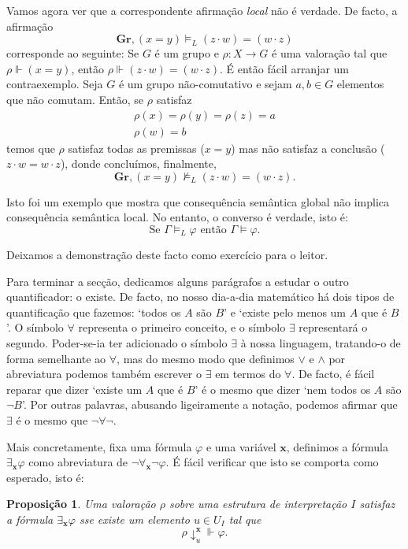 \documentclass{report}
\newtheorem{prop}{Proposição}
\theoremstyle{definition}
\theoremstyle{remark}
\renewcommand{\bf}[1]{\mathbf{#1}}
\begin{document}
	Vamos agora ver que a correspondente afirmação \emph{local} não é verdade. De facto, a afirmação
	\[\mathbf{Gr}, (x = y) \vDash_L (z \cdot w) = (w \cdot z)\]
	corresponde ao seguinte: Se $G$ é um grupo e $\rho : X \to G$ é uma valoração tal que $\rho \Vdash (x = y)$, então $\rho \Vdash (z \cdot w) = (w \cdot z)$. É então fácil arranjar um contraexemplo. Seja $G$ é um grupo não-comutativo e sejam $a, b \in G$ elementos que não comutam. Então, se $\rho$ satisfaz
	\begin{gather*}
	\rho(x) = \rho(y) = \rho(z) = a\\
	\rho(w) = b
	\end{gather*}
	temos que $\rho$ satisfaz todas as premissas ($x = y$) mas não satisfaz a conclusão ($z\cdot w = w\cdot z$), donde concluímos, finalmente,
	\[\mathbf{Gr}, (x = y) \nvDash_L (z \cdot w) = (w \cdot z).\]
	
	Isto foi um exemplo que mostra que consequência semântica global não implica consequência semântica local. No entanto, o converso é verdade, isto é:
	\[\text{Se } \Gamma \vDash_L \varphi \text{ então } \Gamma \vDash \varphi.\]
	
	Deixamos a demonstração deste facto como exercício para o leitor.

	\medskip

	Para terminar a secção, dedicamos alguns parágrafos a estudar o outro quantificador: o existe. De facto, no nosso dia-a-dia matemático há dois tipos de quantificação que fazemos: `todos os $A$ são $B$' e `existe pelo menos um $A$ que é $B$'. O símbolo $\forall$ representa o primeiro conceito, e o símbolo $\exists$ representará o segundo. Poder-se-ia ter adicionado o símbolo $\exists$ à nossa linguagem, tratando-o de forma semelhante ao $\forall$, mas do mesmo modo que definimos $\lor$ e $\land$ por abreviatura podemos também escrever o $\exists$ em termos do $\forall$. De facto, é fácil reparar que dizer `existe um $A$ que é $B$' é o mesmo que dizer `nem todos os $A$ são $\neg B$'. Por outras palavras, abusando ligeiramente a notação, podemos afirmar que $\exists$ é o mesmo que $\neg \forall \neg$.

	Mais concretamente, fixa uma fórmula $\varphi$ e uma variável $\bf x$, definimos a fórmula $\exists_{\bf x} \varphi$ como abreviatura de $\neg \forall_{\bf x} \neg \varphi$. É fácil verificar que isto se comporta como esperado, isto é:

	\begin{prop}
	Uma valoração $\rho$ sobre uma estrutura de interpretação $I$ satisfaz a fórmula $\exists_{\bf x} \varphi$ sse existe um elemento $u \in U_I$ tal que
\[\rho\!\downarrow^{\bf x}_u \Vdash \varphi.\]
	\end{prop}
\end{document}
